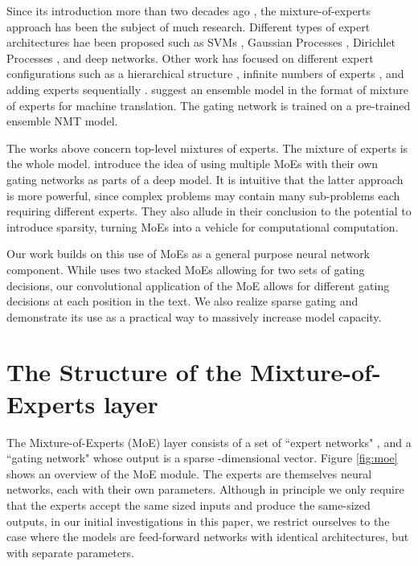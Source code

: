 \documentclass{article} \pdfoutput=1
\begin{document}
Since its introduction more than two decades ago \citep{Jacobs91Adaptive,Jordan1994HME}, the mixture-of-experts approach has been the subject of much research.  Different types of expert architectures hae been proposed such as SVMs \citep{Collobert02PMS}, Gaussian Processes \citep{Tresp2001Mixture,Theis2015Generative,Deisenroth15Distributed}, Dirichlet Processes \citep{Shahbaba09NMU}, and deep networks.  Other work has focused on different expert configurations such as a hierarchical structure \citep{Yao09Hierarchical}, infinite numbers of experts \citep{Rasmussen02Infinite}, and adding experts sequentially \citep{Aljundi16}.  \cite{Garmash2016ensemble} suggest an ensemble model in the format of mixture of experts for machine translation. The gating network is trained on a pre-trained ensemble NMT model.

The works above concern top-level mixtures of experts.  The mixture of experts is the whole model.   \cite{eigen2013learning} introduce the idea of using multiple MoEs with their own gating networks as parts of a deep model.  It is intuitive that the latter approach is more powerful, since complex problems may contain many sub-problems each requiring different experts.  They also allude in their conclusion to the potential to introduce sparsity, turning MoEs into a vehicle for computational computation.  

Our work builds on this use of MoEs as a general purpose neural network component.  While \cite{eigen2013learning} uses two stacked MoEs allowing for two sets of gating decisions, our convolutional application of the MoE allows for different gating decisions at each position in the text.   We also realize sparse gating and demonstrate its use as a practical way to massively increase model capacity.

\section{The Structure of the Mixture-of-Experts layer}\label{sec:gating}

The Mixture-of-Experts (MoE) layer consists of a set of  ``expert networks" , and a ``gating network"  whose output is a sparse -dimensional vector.  Figure \ref{fig:moe} shows an overview of the MoE module. The experts are themselves neural networks, each with their own parameters.  Although in principle we only require that the experts accept the same sized inputs and produce the same-sized outputs, in our initial investigations in this paper, we restrict ourselves to the case where the models are feed-forward networks with identical architectures, but with separate parameters.
\end{document}
